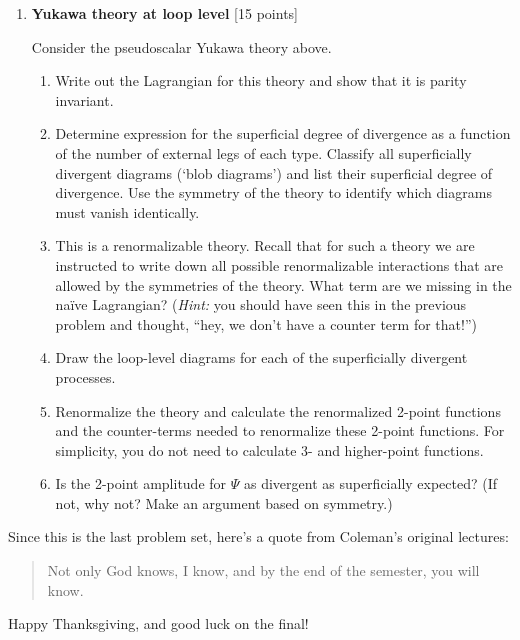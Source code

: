\documentclass[12pt]{article}
\begin{document}
\begin{enumerate}
\item {\bf Yukawa theory at loop level} [15 points]

Consider the pseudoscalar Yukawa theory above. 
\begin{enumerate}
	\item Write out the Lagrangian for this theory and show that it is parity invariant.
	\item Determine expression for the superficial degree of divergence as a function of the number of external legs of each type. Classify all superficially divergent diagrams (`blob diagrams') and list their superficial degree of divergence. Use the symmetry of the theory to identify which diagrams must vanish identically.
	\item This is a renormalizable theory. Recall that for such a theory we are instructed to write down all possible renormalizable interactions that are allowed by the symmetries of the theory. What term are we missing in the na\"ive Lagrangian? (\textit{Hint:} you should have seen this in the previous problem and thought, ``hey, we don't have a counter term for that!'')
	\item Draw the loop-level diagrams for each of the superficially divergent processes.
	\item Renormalize the theory and calculate the renormalized 2-point functions and the counter-terms needed to renormalize these 2-point functions. For simplicity, you do not need to calculate 3- and higher-point functions.
	\item Is the 2-point amplitude for $\Psi$ as divergent as superficially expected? (If not, why not? Make an argument based on symmetry.)
\end{enumerate}


\end{enumerate}

\vspace{1em}

\noindent Since this is the last problem set, here's a quote from Coleman's original lectures: 
\begin{quote}
Not only God knows, I know, and by the end of the semester, you will know.
\end{quote}
Happy Thanksgiving, and good luck on the final!

 
\end{document}
